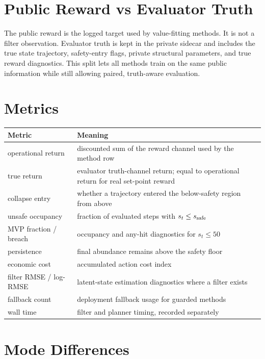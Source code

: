 \documentclass[11pt]{article}
\begin{document}
\section{Public Reward vs Evaluator Truth}

The public reward is the logged target used by value-fitting methods. It is not a
filter observation. Evaluator truth is kept in the private sidecar and includes
the true state trajectory, safety-entry flags, private structural parameters, and
true reward diagnostics. This split lets all methods train on the same public
information while still allowing paired, truth-aware evaluation.

\section{Metrics}

\begin{center}
\begin{tabularx}{\linewidth}{lX}
\toprule
Metric & Meaning \\
\midrule
operational return & discounted sum of the reward channel used by the method row \\
true return & evaluator truth-channel return; equal to operational return for real set-point reward \\
collapse entry & whether a trajectory entered the below-safety region from above \\
unsafe occupancy & fraction of evaluated steps with $s_t \le s_{\mathrm{safe}}$ \\
MVP fraction / breach & occupancy and any-hit diagnostics for $s_t \le 50$ \\
persistence & final abundance remains above the safety floor \\
economic cost & accumulated action cost index \\
filter RMSE / log-RMSE & latent-state estimation diagnostics where a filter exists \\
fallback count & deployment fallback usage for guarded methods \\
wall time & filter and planner timing, recorded separately \\
\bottomrule
\end{tabularx}
\end{center}

\section{Mode Differences}
\end{document}

